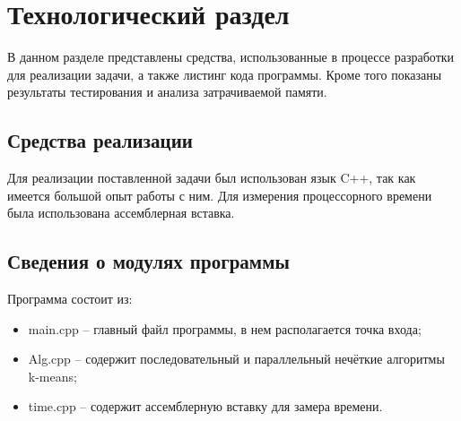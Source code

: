 \chapter{Технологический раздел}
\label{cha:technological}

    В данном разделе представлены средства, использованные в процессе разработки для реализации задачи, а также листинг кода программы. Кроме того показаны результаты тестирования и анализа затрачиваемой памяти.

    \section{Средства реализации}
        Для реализации поставленной задачи был использован язык C++, так как имеется большой опыт работы с ним. Для измерения процессорного времени была использована ассемблерная вставка. 

    \section{Сведения о модулях программы}
    \par Программа состоит из:
    \begin{itemize}
        \item main.cpp -- главный файл программы, в нем располагается точка входа;
        \item Alg.cpp -- содержит последовательный и параллельный нечёткие алгоритмы k-means;
        \item time.cpp -- содержит ассемблерную вставку для замера времени.
    \end{itemize}

